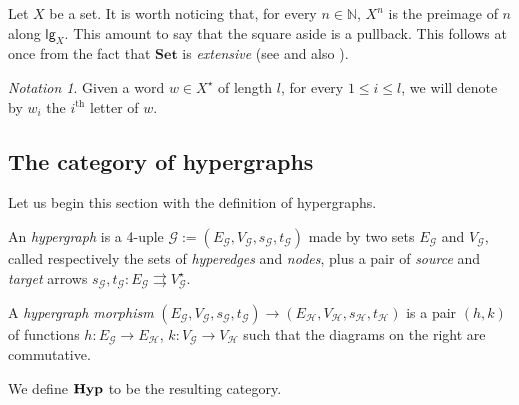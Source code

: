 \documentclass[3p]{elsarticle}
\newcommand{\lgh}{\mathsf{lg}}
\newcommand{\Set}{\mathbf{Set}}
\def\E{\textbf {\textup{E}}}
\newcommand{\catname}[1]{\textbf{\textup{#1}}}
\newcommand{\hyp}{\catname{Hyp}}
\theoremstyle{remark}
\newtheorem*{notaz}{Notation}
\theoremstyle{definition}
\begin{document}
\noindent
\begin{minipage}[r]{.83\linewidth}
	\begin{rem}\label{rem:len} Let $X$ be a set.  It is worth noticing that, for every $n\in \mathbb{N}$, $X^n$ is the preimage of $n$ along $\lgh_{X}$. This amount to say that the square aside is a pullback. This follows at once from the fact that $\Set$ is \emph{extensive} (see \cite{carboni1993introduction} and also ). 
	\end{rem}
\end{minipage}\hfill \begin{minipage}[l]{.15\linewidth}
\xymatrix@R=10pt{X^n \ar@{>->}[r]^{v_n} \ar[d]^{!_{X^n}}& X^\star  \ar[d]^{\lgh_{X}}\\ 1 \ar@{>->}[r]^{\delta_n} & \mathbb{N}}
\end{minipage}

\begin{notaz}
	Given a word $w\in X^\star$ of length $l$, for every $1\leq i \leq l$, we will denote by $w_i$ the $i^\mathrm{th}$ letter of $w$.  
\end{notaz}

\subsection{The category of hypergraphs}

Let us begin this section with the definition of hypergraphs.

\noindent
\begin{minipage}[l]{.83\linewidth}
	\setlength{\parindent}{1.5em}
	\begin{defi}An \emph{hypergraph} is a 4-uple $\mathcal{G}:=(E_\mathcal{G}, V_\mathcal{G}, s_\mathcal{G}, t_\mathcal{G})$ made by two sets $E_\mathcal{G}$ and $V_\mathcal{G}$, called respectively the sets of \emph{hyperedges} and \emph{nodes}, plus a pair of \emph{source} and \emph{target} arrows  $s_\mathcal{G}, t_\mathcal{G}\colon E_\mathcal{G}\rightrightarrows V_\mathcal{G}^\star$. 
		
A \emph{hypergraph morphism} $(E_\mathcal{G}, V_\mathcal{G}, s_\mathcal{G}, t_\mathcal{G})\to (E_\mathcal{H}, V_\mathcal{H}, s_\mathcal{H}, t_\mathcal{H})$ is a pair $(h,k)$ of functions $h\colon E_\mathcal{G}\to E_\mathcal{H}$, $k\colon V_\mathcal{G}\to V_\mathcal{H}$ such that the diagrams on the right are commutative.

We define $\hyp$ to be the resulting category.
\end{defi}\end{minipage} \hfill 
\begin{minipage}[r]{.15\linewidth}
 \hspace{1pt}\\  
\end{minipage}
\end{document}
